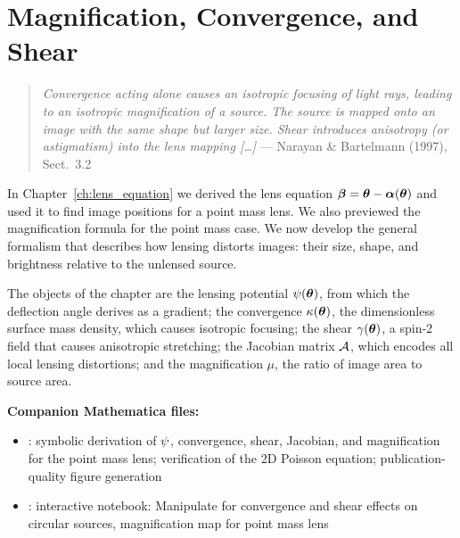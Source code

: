 
\chapter{Magnification, Convergence, and Shear}
\label{ch:magnification}

\begin{quote}
\textit{Convergence acting alone causes an isotropic focusing of light rays, leading
to an isotropic magnification of a source.  The source is mapped onto an image
with the same shape but larger size.  Shear introduces anisotropy (or
astigmatism) into the lens mapping [\ldots]}
\hfill --- Narayan \& Bartelmann (1997), Sect.~3.2
\end{quote}

\noindent
In Chapter~\ref{ch:lens_equation} we derived the lens equation
$\boldsymbol{\beta} = \boldsymbol{\theta} - \boldsymbol{\alpha}(\boldsymbol{\theta})$ and used it to find
image positions for a point mass lens.  We also previewed the
magnification formula for the point mass case.  We now develop the
general formalism that describes how lensing distorts images:
their size, shape, and brightness relative to the unlensed source.

The objects of the chapter are the lensing potential $\psi(\boldsymbol{\theta})$,
from which the deflection angle derives as a gradient; the convergence
$\kappa(\boldsymbol{\theta})$, the dimensionless surface mass density, which
causes isotropic focusing; the shear $\gamma(\boldsymbol{\theta})$, a spin-2
field that causes anisotropic stretching; the Jacobian matrix $\mathcal{A}$,
which encodes all local lensing distortions; and the magnification
$\mu$, the ratio of image area to source area.

\medskip
\noindent
\textbf{Companion Mathematica files:}
\begin{itemize}[nosep]
    \item {}:
          symbolic derivation of $\psi$, convergence, shear,
          Jacobian, and magnification for the point mass lens;
          verification of the 2D Poisson equation; publication-quality
          figure generation
    \item {}:
          interactive notebook: Manipulate for convergence and
          shear effects on circular sources, magnification map for
          point mass lens
\end{itemize}


